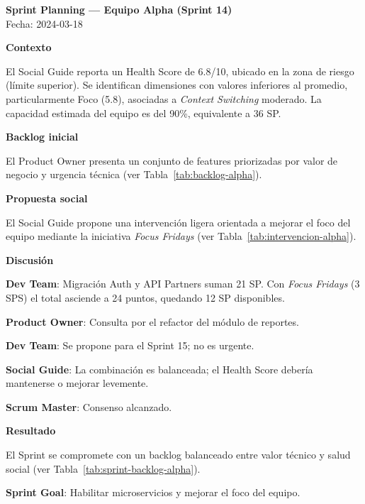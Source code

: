 \begin{escenario}

    \textbf{Sprint Planning — Equipo Alpha (Sprint 14)} \\
    Fecha: 2024-03-18

    \medskip
    \textbf{Contexto}

    El Social Guide reporta un Health Score de 6.8/10, ubicado en la zona
    de riesgo (límite superior). Se identifican dimensiones con valores
    inferiores al promedio, particularmente Foco (5.8), asociadas a
    \textit{Context Switching} moderado. La capacidad estimada del equipo
    es del 90\%, equivalente a 36 SP.

    \medskip
    \textbf{Backlog inicial}

    El Product Owner presenta un conjunto de features priorizadas por
    valor de negocio y urgencia técnica (ver Tabla~\ref{tab:backlog-alpha}).

    \medskip
    \textbf{Propuesta social}

    El Social Guide propone una intervención ligera orientada a mejorar
    el foco del equipo mediante la iniciativa \textit{Focus Fridays}
    (ver Tabla~\ref{tab:intervencion-alpha}).

    \medskip
    \textbf{Discusión}

    \textbf{Dev Team}: Migración Auth y API Partners suman 21 SP. Con
    \textit{Focus Fridays} (3 SPS) el total asciende a 24 puntos, quedando
    12 SP disponibles.

    \textbf{Product Owner}: Consulta por el refactor del módulo de reportes.

    \textbf{Dev Team}: Se propone para el Sprint 15; no es urgente.

    \textbf{Social Guide}: La combinación es balanceada; el Health Score
    debería mantenerse o mejorar levemente.

    \textbf{Scrum Master}: Consenso alcanzado.

    \medskip
    \textbf{Resultado}

    El Sprint se compromete con un backlog balanceado entre valor técnico
    y salud social (ver Tabla~\ref{tab:sprint-backlog-alpha}).

    \medskip
    \textbf{Sprint Goal}: Habilitar microservicios y mejorar el foco del equipo.

\end{escenario}

